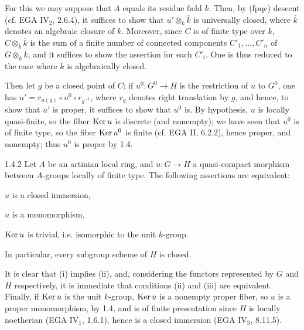 For this we may suppose that $A$ equals its residue field $k$. Then, by (fpqc) descent (cf. EGA IV$_2$, 2.6.4), it suffices to show that $u'\otimes_k\overline k$ is universally closed, where $\overline k$ denotes an algebraic closure of $k$. Moreover, since $C$ is of finite type over $k$, $C\otimes_k\overline k$ is the sum of a finite number of connected components $C'_1,\ldots,C'_n$ of $G\otimes_k\overline k$, and it suffices to show the assertion for each $C'_i$. One is thus reduced to the case where $k$ is algebraically closed.

Then let $g$ be a closed point of $C$; if $u^0:G^0\to H$ is the restriction of $u$ to $G^0$, one has $u'=r_{u(g)}\circ u^0\circ r_{g^{-1}}$, where $r_g$ denotes right translation by $g$, and hence, to show that $u'$ is proper, it suffices to show that $u^0$ is. By hypothesis, $u$ is locally quasi-finite, so the fiber $\operatorname{Ker} u$ is discrete (and nonempty); we have seen that $u^0$ is of finite type, so the fiber $\operatorname{Ker} u^0$ is finite (cf. EGA II, 6.2.2), hence proper, and nonempty; thus $u^0$ is proper by 1.4.
\begin{corollary}{1.4.2}\label{VIB.1.4.2}
Let $A$ be an artinian local ring, and $u:G\to H$ a quasi-compact morphism between $A$-groups locally of finite type. The following assertions are equivalent:
\begin{enumeratei}
\item $u$ is a closed immersion,
\item $u$ is a monomorphism,
\item $\operatorname{Ker} u$ is trivial, i.e. isomorphic to the unit $k$-group.
\end{enumeratei}
In particular, every subgroup scheme of $H$ is closed.
\end{corollary}
It is clear that (i) implies (ii), and, considering the functors represented by $G$ and $H$ respectively, it is immediate that conditions (ii) and (iii) are equivalent. Finally, if $\operatorname{Ker} u$ is the unit $k$-group, $\operatorname{Ker} u$ is a nonempty proper fiber, so $u$ is a proper monomorphism, by 1.4, and is of finite presentation since $H$ is locally noetherian (EGA IV$_1$, 1.6.1), hence is a closed immersion (EGA IV$_3$, 8.11.5).

